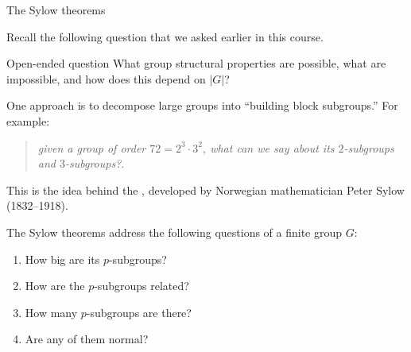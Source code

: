 \documentclass[8pt, handout]{beamer}
\newcommand{\Pause}{}      %
\begin{document}
\begin{frame}{The Sylow theorems} %

  Recall the following question that we asked earlier in this
  course. \smallskip
  
  \begin{exampleblock}{Open-ended question}
    What group structural properties are possible, what are
    impossible, and how does this depend on $|G|$?
  \end{exampleblock}

  \smallskip\Pause
  
  One approach is to decompose large groups into ``building block
  subgroups.'' \Pause For example:
  
  \smallskip
  
  \begin{quote}
    \emph{given a group of order $72=2^3\cdot 3^2$, what can we say
      about its $2$-subgroups and $3$-subgroups?}.
  \end{quote}
    
  \smallskip\Pause

  This is the idea behind the , developed by
  Norwegian mathematician Peter Sylow (1832--1918). \medskip\Pause

  The Sylow theorems address the following questions of a finite group $G$:
  
  \smallskip\Pause
  
  \begin{enumerate}
    \item How big are its $p$-subgroups? \smallskip\Pause
    \item How are the $p$-subgroups related? \smallskip\Pause
    \item How many $p$-subgroups are there? \smallskip\Pause
    \item Are any of them normal? 
  \end{enumerate}
  
\end{frame}

\end{document}
